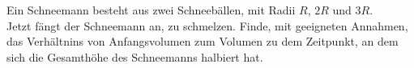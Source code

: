 \begin{Exercise}[label = frosty, origin = {STEP 1991, 1. Paper}, title = {Schneemann}, difficulty = 2]
	Ein Schneemann besteht aus zwei Schneebällen, mit Radii $R$, $2R$ und $3R$.\\
	Jetzt fängt der Schneemann an, zu schmelzen. Finde, mit geeigneten Annahmen, das Verhältnins von Anfangsvolumen zum Volumen zu dem Zeitpunkt, an dem sich die Gesamthöhe des Schneemanns halbiert hat.
\end{Exercise}